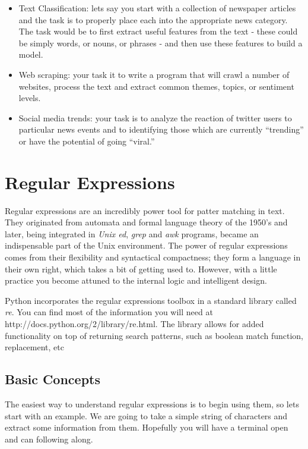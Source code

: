 \begin{itemize}
    \item Text Classification: lets say you start with a collection of newspaper articles and the task is to properly place each into the appropriate news category. The task would be to first extract useful features from the text - these could be simply words, or nouns, or phrases - and then use these features to build a model.
    \item Web scraping: your task it to write a program that will crawl a number of websites, process the text and extract common themes, topics, or sentiment levels.
    \item Social media trends: your task is to analyze the reaction of twitter users to particular news events and to identifying those which are currently ``trending'' or have the potential of going ``viral.'' 
\end{itemize}

\section{Regular Expressions}
\label{regex}

Regular expressions \cite{WPRegEx} are an incredibly power tool for patter matching in text. 
They originated from automata and formal language theory of the 1950's and later, being integrated in \textit{Unix ed}, \textit{grep} 
and \textit{awk} programs, became an indispensable part of the Unix environment. The power of regular expressions comes from their flexibility and syntactical 
compactness; they form a language in their own right, which takes a bit of getting used to. However, with 
a little practice you become attuned to the internal logic and intelligent design. 

Python incorporates the regular expressions toolbox in a standard library called \textit{re}. You can find most of the 
information you will need at \\ http://docs.python.org/2/library/re.html. The library allows for added 
functionality on top of returning search patterns, such as boolean match function, replacement, etc

\subsection{Basic Concepts}

The easiest way to understand regular expressions is to begin using them, so lets start with an example. We are going to 
take a simple string of characters and extract some information from them. Hopefully you will have a terminal open
and can following along. 

